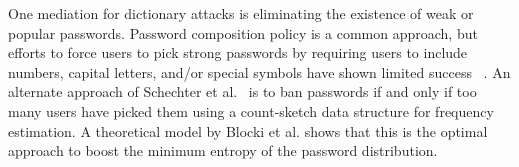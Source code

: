  One mediation for dictionary attacks is eliminating the existence of weak or popular passwords. Password composition policy is a common approach, but efforts to force users to pick strong passwords by requiring users to include numbers, capital letters, and/or special symbols have shown limited success ~\cite{KSKMBCCE:SIGCHI11, BKPS:ACMEC13}. An alternate approach of Schechter et al.~\cite{HTS:SchHerMit10} is to ban passwords if and only if too many users have picked them using a count-sketch data structure for frequency estimation. A theoretical model by Blocki et al. \cite{BKPS:ACMEC13} shows that this is the optimal approach to boost the minimum entropy of the password distribution.  


\vspace*{-\baselineskip}

